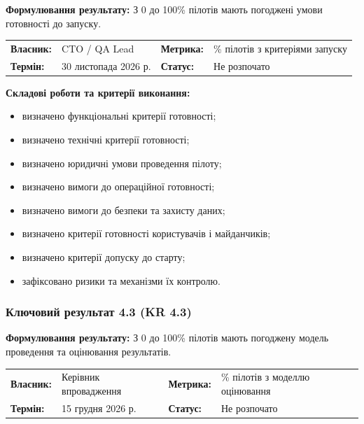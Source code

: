 \documentclass{article}
\begin{document}
\textbf{Формулювання результату:} З 0 до 100\% пілотів мають погоджені умови готовності до запуску.

\noindent\begin{tabular}{@{}p{2.2cm}p{4.5cm}p{2.2cm}p{4.5cm}@{}}
\toprule
\textbf{Власник:} & CTO / QA Lead & \textbf{Метрика:} & \% пілотів з критеріями запуску \\
\textbf{Термін:} & 30 листопада 2026 р. & \textbf{Статус:} & Не розпочато \\
\bottomrule
\end{tabular}

\vspace{10pt}
\textbf{Складові роботи та критерії виконання:}
\begin{itemize}
    \item визначено функціональні критерії готовності;
    \item визначено технічні критерії готовності;
    \item визначено юридичні умови проведення пілоту;
    \item визначено вимоги до операційної готовності;
    \item визначено вимоги до безпеки та захисту даних;
    \item визначено критерії готовності користувачів і майданчиків;
    \item визначено критерії допуску до старту;
    \item зафіксовано ризики та механізми їх контролю.
\end{itemize}

\subsubsection{Ключовий результат 4.3 (KR 4.3)}

\textbf{Формулювання результату:} З 0 до 100\% пілотів мають погоджену модель проведення та оцінювання результатів.

\noindent\begin{tabular}{@{}p{2.2cm}p{4.5cm}p{2.2cm}p{4.5cm}@{}}
\toprule
\textbf{Власник:} & Керівник впровадження & \textbf{Метрика:} & \% пілотів з моделлю оцінювання \\
\textbf{Термін:} & 15 грудня 2026 р. & \textbf{Статус:} & Не розпочато \\
\bottomrule
\end{tabular}
\end{document}
